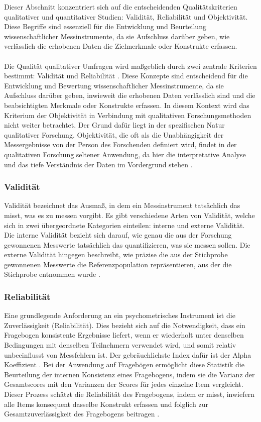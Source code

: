 \documentclass[german,report]{i1thesis}
\begin{document}
Dieser Abschnitt konzentriert sich auf die entscheidenden Qualitätskriterien qualitativer und quantitativer Studien: Validität, Reliabilität und Objektivität. Diese Begriffe sind essenziell für die Entwicklung und Beurteilung wissenschaftlicher Messinstrumente, da sie Aufschluss darüber geben, wie verlässlich die erhobenen Daten die Zielmerkmale oder Konstrukte erfassen.\\
\\
Die Qualität qualitativer Umfragen wird maßgeblich durch zwei zentrale Kriterien bestimmt: Validität und Reliabilität \cite{Bolarinwa2015}. Diese Konzepte sind entscheidend für die Entwicklung und Bewertung wissenschaftlicher Messinstrumente, da sie Aufschluss darüber geben, inwieweit die erhobenen Daten verlässlich sind und die beabsichtigten Merkmale oder Konstrukte erfassen. In diesem Kontext wird das Kriterium der Objektivität in Verbindung mit qualitativen Forschungsmethoden nicht weiter betrachtet. Der Grund dafür liegt in der spezifischen Natur qualitativer Forschung. Objektivität, die oft als die Unabhängigkeit der Messergebnisse von der Person des Forschenden definiert wird, findet in der qualitativen Forschung seltener Anwendung, da hier die interpretative Analyse und das tiefe Verständnis der Daten im Vordergrund stehen \cite{Flick2020}. 

\subsubsection{Validität}

Validität bezeichnet das Ausmaß, in dem ein Messinstrument tatsächlich das misst, was es zu messen vorgibt. Es gibt verschiedene Arten von Validität, welche sich in zwei übergeordnete Kategorien einteilen: interne und externe Validität. Die interne Validität bezieht sich darauf, wie genau die aus der Forschung gewonnenen Messwerte tatsächlich das quantifizieren, was sie messen sollen. Die externe Validität hingegen beschreibt, wie präzise die aus der Stichprobe gewonnenen Messwerte die Referenzpopulation repräsentieren, aus der die Stichprobe entnommen wurde \cite{Bolarinwa2015}. 

\subsubsection{Reliabilität}

Eine grundlegende Anforderung an ein psychometrisches Instrument ist die Zuverlässigkeit (Reliabilität). Dies bezieht sich auf die Notwendigkeit, dass ein Fragebogen konsistente Ergebnisse liefert, wenn er wiederholt unter denselben Bedingungen mit denselben Teilnehmern verwendet wird, und somit relativ unbeeinflusst von Messfehlern ist. Der gebräuchlichste Index dafür ist der Alpha Koeffizient \cite{Cronbach1951}. Bei der Anwendung auf Fragebögen ermöglicht diese Statistik die Beurteilung der internen Konsistenz eines Fragebogens, indem sie die Varianz der Gesamtscores mit den Varianzen der Scores für jedes einzelne Item vergleicht. Dieser Prozess schätzt die Reliabilität des Fragebogens, indem er misst, inwiefern alle Items konsequent dasselbe Konstrukt erfassen und folglich zur Gesamtzuverlässigkeit des Fragebogens beitragen \cite{BRAUN20121}.\\
\end{document}
